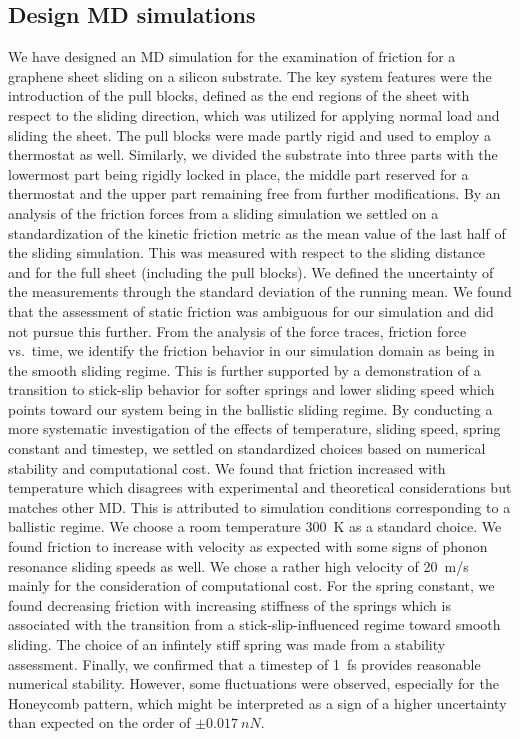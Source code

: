 \subsection{Design MD simulations}
We have designed an \acrshort{MD} simulation for the examination of friction for
a graphene sheet sliding on a silicon substrate. The key system features were
the introduction of the pull blocks, defined as the end regions of the sheet
with respect to the sliding direction, which was utilized for applying normal
load and sliding the sheet. The pull blocks were made partly rigid and used to
employ a thermostat as well. Similarly, we divided the substrate into three
parts with the lowermost part being rigidly locked in place, the middle part
reserved for a thermostat and the upper part remaining free from further
modifications. By an analysis of the friction forces from a sliding simulation
we settled on a standardization of the kinetic friction metric as the mean value
of the last half of the sliding simulation. This was measured with respect to
the sliding distance and for the full sheet (including the pull blocks). We
defined the uncertainty of the measurements through the standard deviation of
the running mean. We found that the assessment of static friction was ambiguous
for our simulation and did not pursue this further. From the analysis of the
force traces, friction force vs.\ time, we identify the friction behavior in our
simulation domain as being in the smooth sliding regime. This is further
supported by a demonstration of a transition to stick-slip behavior for softer
springs and lower sliding speed which points toward our system being in the
ballistic sliding regime. By conducting a more systematic investigation of the
effects of temperature, sliding speed, spring constant and timestep, we settled
on standardized choices based on numerical stability and computational cost. We
found that friction increased with temperature which disagrees with experimental
and theoretical considerations but matches other \acrshort{MD}. This is
attributed to simulation conditions corresponding to a ballistic regime. We choose a room temperature \SI{300}{K} as a standard choice. We
found friction to increase with velocity as expected with some signs of phonon
resonance sliding speeds as well. We chose a rather high velocity of \SI{20}{m/s} mainly for the consideration of computational cost. For the spring constant, we found decreasing friction with increasing stiffness of the springs which is associated with the transition from a stick-slip-influenced regime toward smooth sliding. The choice of an infintely stiff spring was made from a stability assessment.  Finally, we
confirmed that a timestep of \SI{1}{fs} provides reasonable numerical stability.
However, some fluctuations were observed, especially for the Honeycomb pattern,
which might be interpreted as a sign of a higher uncertainty than expected on the order of $\pm \SI{0.017}{nN}$.



